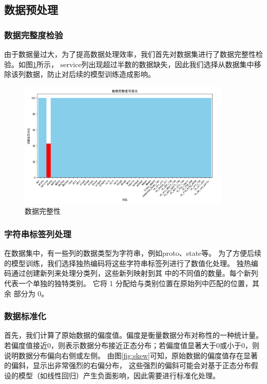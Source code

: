 \documentclass{article}
\begin{document}
\subsection{数据预处理}

\subsubsection{数据完整度检验}
由于数据量过大，为了提高数据处理效率，我们首先对数据集进行了数据完整性检验。如图\ref{fig:full}所示，
service列出现超过半数的数据缺失，因此我们选择从数据集中移除该列数据，防止对后续的模型训练造成影响。
\begin{figure}[htpb]
  \centering
  \includegraphics[width=0.9\textwidth]{./png/full.png}
  \caption{数据完整性}
  \label{fig:full}
\end{figure}
\subsubsection{字符串标签列处理}
在数据集中，有一些列的数据类型为字符串，例如proto、state等。
为了方便后续的模型训练，我们选择独热编码将这些字符串标签列进行了数值化处理。
独热编码通过创建新列来处理分类列，这些新列映射到其
中的不同值的数量。每个新列代表一个单独的独特类别。
它将 1 分配给与类别位置在原始列中匹配的位置，其余
部分为 0。
\subsubsection{数据标准化}

首先，我们计算了原始数据的偏度值。偏度是衡量数据分布对称性的一种统计量。
若偏度值接近0，则表示数据分布接近正态分布；若偏度值显著大于0或小于0，则说明数据分布偏向右侧或左侧。
由图\ref{fig:skew}可知，原始数据的偏度值存在显著的偏斜，显示出非常强烈的右偏分布，
这些强烈的偏斜可能会对基于正态分布假设的模型（如线性回归）产生负面影响，因此需要进行标准化处理。
\end{document}
